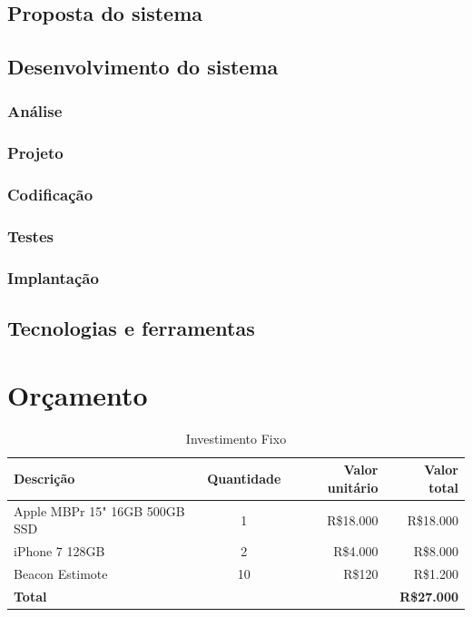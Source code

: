 \documentclass[
	12pt,
	oneside,
	a4paper,
	english,
	brazil,
]{abntex2}
\begin{document}
\section{Proposta do sistema}
\section{Desenvolvimento do sistema}
\subsection{Análise}
\subsection{Projeto}
\subsection{Codificação}
\subsection{Testes}
\subsection{Implantação}
\section{Tecnologias e ferramentas}




\chapter{Orçamento}

\begin{table}[ht]
\caption{Investimento Fixo}
\centering
\begin{tabular}{l c r r}
\hline\hline
Descrição & Quantidade & Valor unitário & Valor total \\ [0.5ex]
\hline
Apple MBPr 15" 16GB 500GB SSD&1&R\$18.000&R\$18.000 \\
iPhone 7 128GB&2&R\$4.000&R\$8.000 \\
Beacon Estimote&10&R\$120&R\$1.200 \\ [1ex]
\hline
\textbf{Total}&&&\textbf{R\$27.000} \\ [1ex]
\end{tabular}
\label{table:nonlin}
\end{table}
\end{document}
